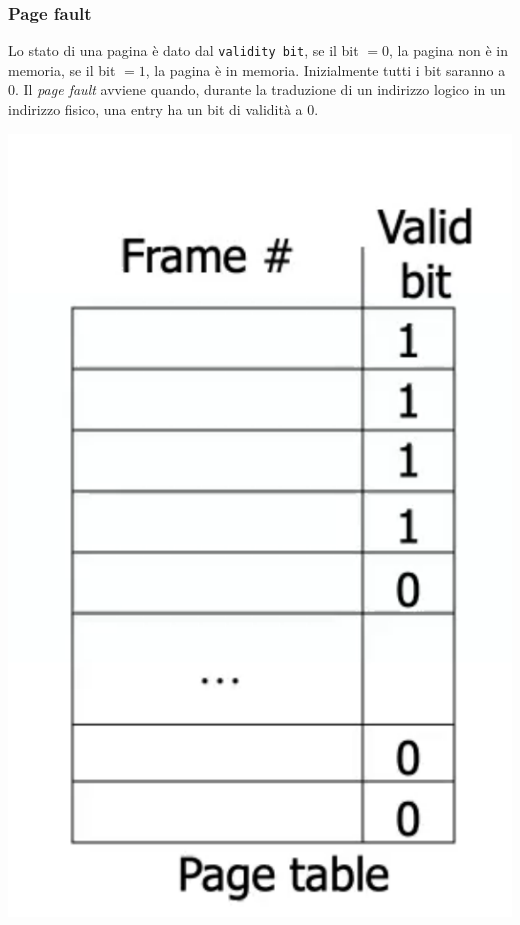\documentclass[a4paper,12pt, twoside]{report}
\begin{document}
\subsubsection{Page fault}
Lo stato di una pagina \`e dato dal \texttt{validity bit}, se il bit $= 0$, la pagina non \`e in 
memoria, se il bit $= 1$, la pagina \`e in memoria. Inizialmente tutti i bit saranno a $0$. 
Il \emph{page fault} avviene quando, durante la traduzione di un indirizzo logico in un indirizzo fisico,
una entry ha un bit di validit\`a a $0$.
\begin{center}
\includegraphics[scale=0.15]{page_table_fault}
\end{center} 
\end{document}
